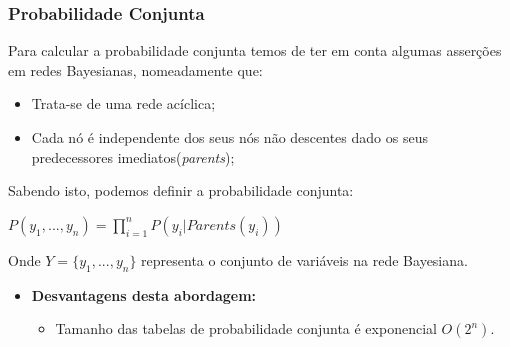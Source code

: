 \documentclass[9pt, a4paper, twocolumn]{article}
\begin{document}
\subsubsection{Probabilidade Conjunta}
\hspace{10mm}Para calcular a probabilidade conjunta temos de ter em conta algumas asserções em redes Bayesianas, nomeadamente que:
\begin{itemize}
\item Trata-se de uma rede acíclica; 
\item Cada nó é independente dos seus nós não descentes dado os seus predecessores imediatos(\textit{parents});
\end{itemize}
Sabendo isto, podemos definir a probabilidade conjunta:
\begin{center}
$P(y_{1},...,y_{n}) = \displaystyle\prod_{i=1}^{n}P(y_{i}|Parents(y_{i}))$ 
\end{center}
Onde $Y = \{y_{1},..., y_{n}\}$ representa o conjunto de variáveis na rede Bayesiana.
\begin{itemize}
\item \textbf{Desvantagens desta abordagem:}
\begin{itemize}
\item Tamanho das tabelas de probabilidade conjunta é exponencial \emph{$O(2^n)$}.
\end{itemize}
\end{itemize}
\end{document}
